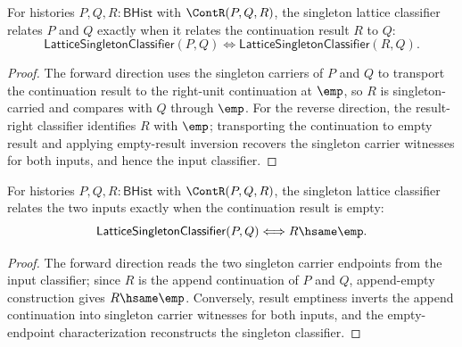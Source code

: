 \begin{theorem}
\label{thm:lattice-singleton-classifier-continuation-result-right}
For histories $P,Q,R:\mathsf{BHist}$ with $\ContR(P,Q,R)$, the singleton
lattice classifier relates $P$ and $Q$ exactly when it relates the
continuation result $R$ to $Q$:
$$
\mathsf{LatticeSingletonClassifier}(P,Q)
\Longleftrightarrow
\mathsf{LatticeSingletonClassifier}(R,Q).
$$
\end{theorem}
\begin{proof}
The forward direction uses the singleton carriers of $P$ and $Q$ to transport
the continuation result to the right-unit continuation at $\emp$, so $R$ is
singleton-carried and compares with $Q$ through $\emp$. For the reverse
direction, the result-right classifier identifies $R$ with $\emp$; transporting
the continuation to empty result and applying empty-result inversion recovers
the singleton carrier witnesses for both inputs, and hence the input
classifier.
\end{proof}

\begin{theorem}
\label{thm:lattice-singleton-classifier-continuation-empty-result}
For histories $P,Q,R:\mathsf{BHist}$ with $\ContR(P,Q,R)$, the singleton
lattice classifier relates the two inputs exactly when the continuation result
is empty:
$$
\mathsf{LatticeSingletonClassifier}(P,Q)
\Longleftrightarrow
R\hsame\emp.
$$
\end{theorem}
\begin{proof}
The forward direction reads the two singleton carrier endpoints from the input
classifier; since $R$ is the append continuation of $P$ and $Q$, append-empty
construction gives $R\hsame\emp$. Conversely, result emptiness inverts the
append continuation into singleton carrier witnesses for both inputs, and the
empty-endpoint characterization reconstructs the singleton classifier.
\end{proof}

